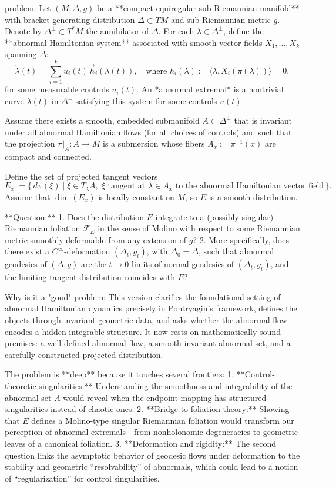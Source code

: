 problem:  
Let \((M,\Delta,g)\) be a **compact equiregular sub-Riemannian manifold** with bracket-generating distribution \(\Delta \subset TM\) and sub-Riemannian metric \(g\).  
Denote by \(\Delta^\perp \subset T^*M\) the annihilator of \(\Delta\). For each \(\lambda \in \Delta^\perp\), define the **abnormal Hamiltonian system** associated with smooth vector fields \(X_1, \dots, X_k\) spanning \(\Delta\):  
\[
\dot{\lambda}(t) = \sum_{i=1}^k u_i(t)\,\vec{h}_i(\lambda(t)), \quad \text{where } h_i(\lambda) := \langle \lambda, X_i(\pi(\lambda)) \rangle = 0,
\]
for some measurable controls \(u_i(t)\). An *abnormal extremal* is a nontrivial curve \(\lambda(t)\) in \(\Delta^\perp\) satisfying this system for some controls \(u(t)\).

Assume there exists a smooth, embedded submanifold \(A \subset \Delta^\perp\) that is invariant under all abnormal Hamiltonian flows (for all choices of controls) and such that the projection \(\pi|_A: A \to M\) is a submersion whose fibers \(A_x := \pi^{-1}(x)\) are compact and connected.

Define the set of projected tangent vectors
\[
E_x := \{\,d\pi(\xi) \mid \xi \in T_\lambda A, \; \xi \text{ tangent at } \lambda \in A_x \text{ to the abnormal Hamiltonian vector field}\,\}.
\]
Assume that \(\dim(E_x)\) is locally constant on \(M\), so \(E\) is a smooth distribution.

**Question:**  
1. Does the distribution \(E\) integrate to a (possibly singular) Riemannian foliation \(\mathcal{F}_E\) in the sense of Molino with respect to some Riemannian metric smoothly deformable from any extension of \(g\)?  
2. More specifically, does there exist a \(C^\infty\)-deformation \((\Delta_t, g_t)\), with \(\Delta_0 = \Delta\), such that abnormal geodesics of \((\Delta,g)\) are the \(t\to 0\) limits of normal geodesics of \((\Delta_t,g_t)\), and the limiting tangent distribution coincides with \(E\)?  

Why is it a "good" problem:  
This version clarifies the foundational setting of abnormal Hamiltonian dynamics precisely in Pontryagin’s framework, defines the objects through invariant geometric data, and asks whether the abnormal flow encodes a hidden integrable structure. It now rests on mathematically sound premises: a well-defined abnormal flow, a smooth invariant abnormal set, and a carefully constructed projected distribution.

The problem is **deep** because it touches several frontiers:  
1. **Control-theoretic singularities:** Understanding the smoothness and integrability of the abnormal set \(A\) would reveal when the endpoint mapping has structured singularities instead of chaotic ones.  
2. **Bridge to foliation theory:** Showing that \(E\) defines a Molino-type singular Riemannian foliation would transform our perception of abnormal extremals—from nonholonomic degeneracies to geometric leaves of a canonical foliation.  
3. **Deformation and rigidity:** The second question links the asymptotic behavior of geodesic flows under deformation to the stability and geometric “resolvability” of abnormals, which could lead to a notion of “regularization” for control singularities.  

